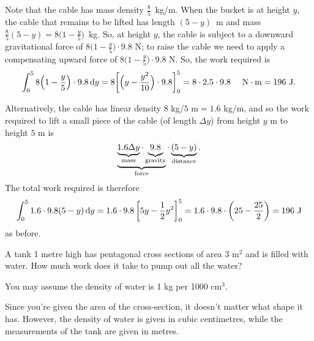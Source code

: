 \begin{solution}
Note that the cable has mass density $\frac{8}{5}$~kg/m.
When the bucket is at height $y$, the cable that remains to be lifted has length $(5-y)$~m
and mass $\frac{8}{5}(5-y)=8\big(1-\frac{y}{5}\big)$~kg.
So, at height $y$, the cable is subject to a downward gravitational force
of $8\big(1-\frac{y}{5}\big)\cdot9.8$ N; to raise the cable we need
to apply a compensating upward force of $8\big(1-\frac{y}{5}\big)\cdot9.8$ N.
So, the work required is
\begin{equation*}
\int_0^{5}8\Big(1-\frac{y}{5}\Big)\cdot9.8\,\dee{y}
=8\bigg[\Big(y-\frac{y^2}{10}\Big)\cdot9.8\bigg]_0^{5}
=8\cdot 2.5\cdot 9.8 \quad\text{ N}\cdot\text{m}= 196\ \mathrm{J}.
\end{equation*}

Alternatively, the cable has linear density $8$ kg${}/5$ m${}= 1.6$ kg${}/{}$m, and so the work required to lift a small piece of the cable (of length $\Delta y$) from height $y$ m to height $5$ m is
\[\underbrace{\underbrace{1.6\Delta y}_{\text{mass}}\cdot\underbrace{9.8\vphantom{y}}_{\text{gravity}}}_{\text{force}}\cdot\underbrace{(5-y)}_{\text{distance}}.\] The total work required is therefore
$$
\int_0^{5} 1.6\cdot9.8(5-y) \,\mathrm{d}y = 1.6\cdot9.8\left[5y-\frac{1}{2}y^2\right]_0^5=1.6\cdot9.8\cdot\left(25-\frac{25}{2}\right) = 196\ \mathrm{J}
$$
as before.
\end{solution}
\begin{question}\label{prob_s2.1:tank3}
A  tank 1 metre high has pentagonal cross sections of area 3 m$^2$ and is filled with water. How much work does it take to pump out all the water?

You may assume the density of water is 1 kg per 1000 cm$^3$.
\begin{center}
\end{center}
\end{question}
\begin{hint}
Since you're given the area of the cross-section, it doesn't matter what shape it has. However, the  density of water is given in cubic centimetres, while the measurements of the tank are given in metres.
\end{hint}
